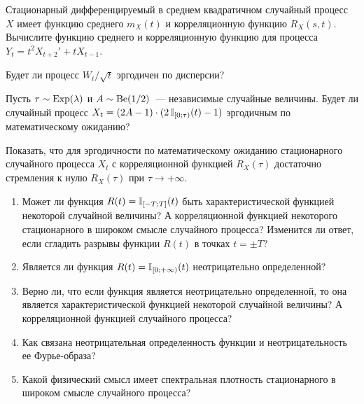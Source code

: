 \documentclass[12pt]{article}
\def\canon{\textbf{(каноническое задание)}}
\begin{document}
\begin{exercise}
    Стационарный дифференцируемый в среднем квадратичном случайный процесс $ X $
    имеет функцию среднего $ m_X(t) $ и корреляционную функцию $ R_X(s, t) $.
    Вычислите функцию среднего и корреляционную функцию для процесса $ Y_t = t^2 X_{t + 2}' + t X_{t - 1} $.
\end{exercise}


\begin{exercise}
    Будет ли процесс $ W_t / \sqrt{t} $ эргодичен по дисперсии?
\end{exercise}


\begin{exercise}
    Пусть $ \tau \sim \textnormal{Exp}(\lambda) $ и $ A \sim \textnormal{Be}(1/2) $~--- независимые случайные величины.
    Будет ли случайный процесс $ X_t = (2A - 1) \cdot (2 \, \mathbb{I}_{[0;\tau)}(t) - 1) $ эргодичным по математическому ожиданию?
\end{exercise}


\begin{exercise}
    Показать, что для эргодичности по математическому ожиданию стационарного случайного процесса $ X_t $
    с корреляционной функцией $ R_X(\tau) $ достаточно стремления к нулю $ R_X(\tau) $ при $ \tau \to +\infty $.
\end{exercise}

\newpage




\begin{exercise}[subtitle={\canon}]
    \begin{enumerate}
        \item
            Может ли функция $ R(t) = \mathbb{I}_{[-T;T]}(t) $ быть характеристической функцией некоторой случайной величины?
            А корреляционной функцией некоторого стационарного в широком смысле случайного процесса?
            Изменится ли ответ, если сгладить разрывы функции $ R(t) $ в точках $ t = \pm T $?
        \item
            Является ли функция $ R(t) = \mathbb{I}_{[0;+\infty)}(t) $ неотрицательно определенной?
        \item
            Верно ли, что если функция является неотрицательно определенной,
            то она является характеристической функцией некоторой случайной величины?
            А корреляционной функцией случайного процесса?
        \item
            Как связана неотрицательная определенность функции и неотрицательность ее Фурье-образа?
        \item
            Какой физический смысл имеет спектральная плотность стационарного в широком смысле случайного процесса?
    \end{enumerate}
\end{exercise}
\end{document}
